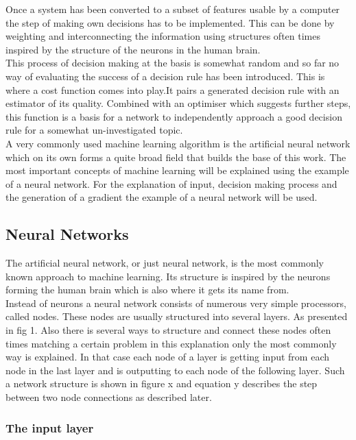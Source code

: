 Once a system has been converted to a subset of features usable by a computer the step of making own decisions has to be implemented. This can be done by weighting and interconnecting the information using structures often times inspired by the structure of the neurons in the human brain.\\
This process of decision making at the basis is somewhat random and so far no way of evaluating the success of a decision rule has been introduced. This is where a cost function comes into play.It pairs a generated decision rule with an estimator of its quality. Combined with an optimiser which suggests further steps, this function is a basis for a network to independently approach a good decision rule for a somewhat un-investigated topic.\\
A very commonly used machine learning algorithm is the artificial neural network which on its own forms a quite broad field that builds the base of this work. The most important concepts of machine learning will be explained using the example of a neural network. For the explanation of input, decision making process and the generation of a gradient the example of a neural network will be used.

\subsection{Neural Networks}

The artificial neural network, or just neural network, is the most commonly known approach to machine learning. Its structure is inspired by the neurons forming the human brain which is also where it gets its name from.\\
Instead of neurons a neural network consists of numerous very simple processors, called nodes. These nodes are usually structured into several layers. As presented in fig 1. Also there is several ways to structure and connect these nodes often times matching a certain problem in this explanation only the most commonly way is explained. In that case each node of a layer is getting input from each node in the last layer and is outputting to each node of the following layer. Such a network structure is shown in figure x and equation y describes the step between two node connections as described later.

\subsubsection{The input layer}

